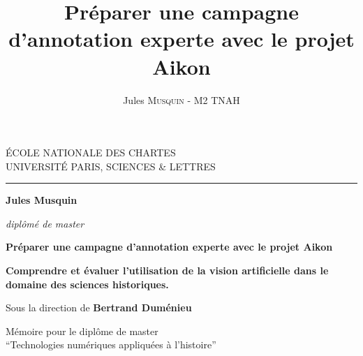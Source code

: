 \documentclass[12pt,twoside]{book}
\author{Jules \textsc{Musquin} - M2 TNAH}
\title{Préparer une campagne d'annotation experte avec le projet Aikon}
\begin{document}
	\begin{titlepage}
		\begin{center}
			
			\bigskip
			
			\begin{large}				
				ÉCOLE NATIONALE DES CHARTES\\
				UNIVERSITÉ PARIS, SCIENCES \& LETTRES
			\end{large}
			\begin{center}\rule{2cm}{0.02cm}\end{center}
			
			\bigskip
			\bigskip
			\bigskip
			\begin{Large}
				\textbf{Jules Musquin}\\
			\end{Large}
			\begin{normalsize}
				\textit{diplômé de master}
			\end{normalsize}
			
			\bigskip
			\bigskip
			\bigskip
			
			\begin{Huge}
				\textbf{Préparer une campagne d'annotation experte avec le projet Aikon}\\
			\end{Huge}
			\bigskip
			\bigskip
			\begin{LARGE}
				\textbf{Comprendre et évaluer l'utilisation de la vision artificielle dans le domaine des sciences historiques.}\\
			\end{LARGE}
			
			\bigskip
			\bigskip
			\bigskip
			\begin{large}
				Sous la direction de \textbf{Bertrand Duménieu}
			\end{large}
			\vfill
			
			\begin{large}
				Mémoire 
				pour le diplôme de master \\
				\enquote{Technologies numériques appliquées à l'histoire} \\
			\end{large}
			
		\end{center}
	\end{titlepage}

	\thispagestyle{empty}	
	\cleardoublepage
	
\frontmatter
\end{document}
